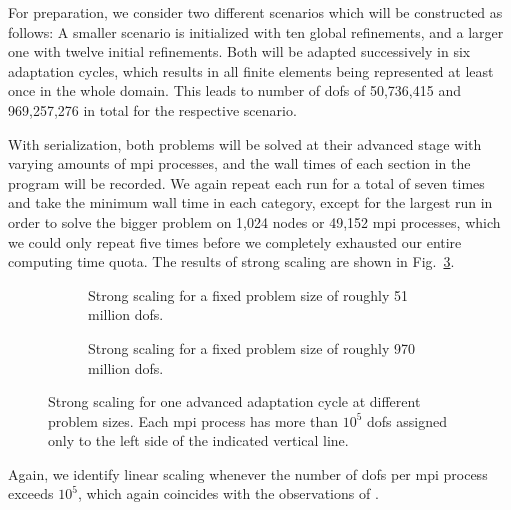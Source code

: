 For preparation, we consider two different scenarios which will be constructed as follows: A smaller scenario is initialized with ten global refinements, and a larger one with twelve initial refinements. Both will be adapted successively in six adaptation cycles, which results in all finite elements being represented at least once in the whole domain. This leads to number of \glspl{dof} of 50,736,415 and 969,257,276 in total for the respective scenario.

With serialization, both problems will be solved at their advanced stage with varying amounts of \gls{mpi} processes, and the wall times of each section in the program will be recorded. We again repeat each run for a total of seven times and take the minimum wall time in each category, except for the largest run in order to solve the bigger problem on 1,024 nodes or 49,152 \gls{mpi} processes, which we could only repeat five times before we completely exhausted our entire computing time quota. The results of strong scaling are shown in Fig.~\ref{fig:strong}.

\begin{figure}
\begin{subfigure}{1\textwidth}
  \centering
  \caption{Strong scaling for a fixed problem size of roughly 51 million \glspl{dof}.}
  \label{fig:strong-nrefs10}
\end{subfigure}
\begin{subfigure}{1\textwidth}
  \centering
  \caption{Strong scaling for a fixed problem size of roughly 970 million \glspl{dof}.}
  \label{fig:strong-nrefs12}
\end{subfigure}
\caption{Strong scaling for one advanced adaptation cycle at different problem sizes. Each \gls{mpi} process has more than $10^5$ \glspl{dof} assigned only to the left side of the indicated vertical line.}
\label{fig:strong}
\end{figure}

Again, we identify linear scaling whenever the number of \glspl{dof} per \gls{mpi} process exceeds $10^5$, which again coincides with the observations of \textcite{bangerth2012}.